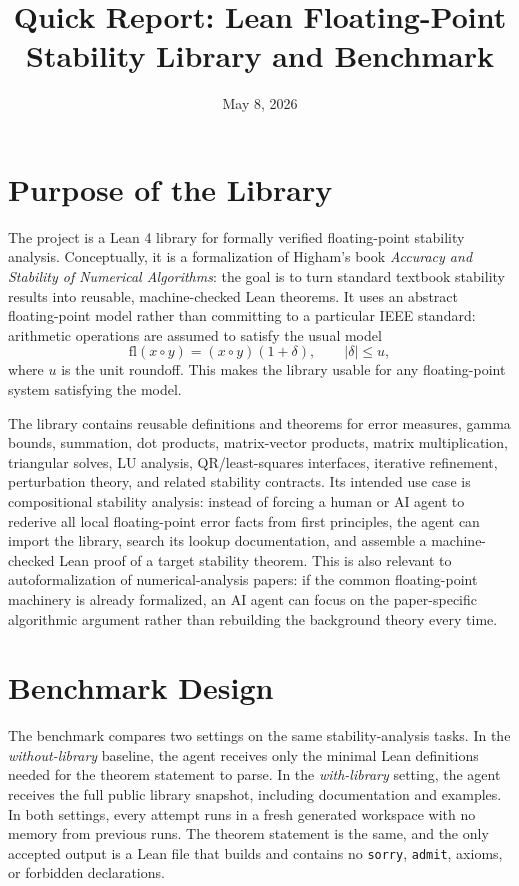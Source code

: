 \documentclass[10pt]{article}
\title{\vspace{-1.4cm}Quick Report: Lean Floating-Point Stability Library and Benchmark}
\author{}
\date{May 8, 2026}
\begin{document}
\maketitle
\vspace{-1.2cm}

\section*{Purpose of the Library}

The project is a Lean 4 library for formally verified floating-point stability
analysis.  Conceptually, it is a formalization of Higham's book
\emph{Accuracy and Stability of Numerical Algorithms}: the goal is to turn
standard textbook stability results into reusable, machine-checked Lean
theorems.  It uses an abstract floating-point model rather than committing to a
particular IEEE standard: arithmetic operations are assumed to satisfy the usual
model
\[
  \mathrm{fl}(x \circ y) = (x \circ y)(1+\delta), \qquad |\delta| \leq u,
\]
where \(u\) is the unit roundoff.  This makes the library usable for any
floating-point system satisfying the model.

The library contains reusable definitions and theorems for error measures,
gamma bounds, summation, dot products, matrix-vector products, matrix
multiplication, triangular solves, LU analysis, QR/least-squares interfaces,
iterative refinement, perturbation theory, and related stability contracts.
Its intended use case is compositional stability analysis: instead of forcing a
human or AI agent to rederive all local floating-point error facts from first
principles, the agent can import the library, search its lookup documentation,
and assemble a machine-checked Lean proof of a target stability theorem.  This
is also relevant to autoformalization of numerical-analysis papers: if the
common floating-point machinery is already formalized, an AI agent can focus on
the paper-specific algorithmic argument rather than rebuilding the background
theory every time.

\section*{Benchmark Design}

The benchmark compares two settings on the same stability-analysis tasks.  In
the \emph{without-library} baseline, the agent receives only the minimal Lean
definitions needed for the theorem statement to parse.  In the
\emph{with-library} setting, the agent receives the full public library
snapshot, including documentation and examples.  In both settings, every
attempt runs in a fresh generated workspace with no memory from previous runs.
The theorem statement is the same, and the only accepted output is a Lean file
that builds and contains no \texttt{sorry}, \texttt{admit}, axioms, or
forbidden declarations.
\end{document}
